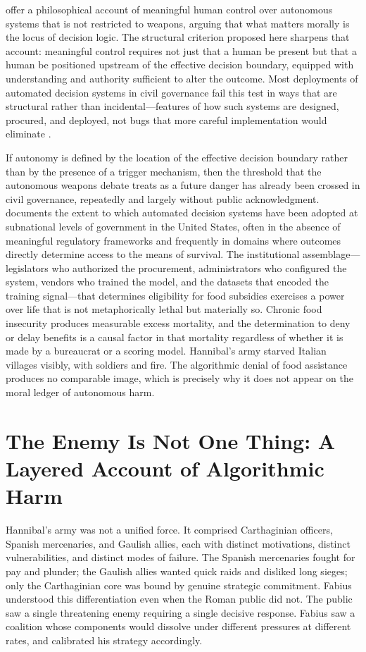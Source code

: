 \documentclass[12pt, a4paper]{article}
\begin{document}
\citet{santoni2018} offer a philosophical account of meaningful human control over autonomous systems that is not restricted to weapons, arguing that what matters morally is the locus of decision logic. The structural criterion proposed here sharpens that account: meaningful control requires not just that a human be present but that a human be positioned upstream of the effective decision boundary, equipped with understanding and authority sufficient to alter the outcome. Most deployments of automated decision systems in civil governance fail this test in ways that are structural rather than incidental---features of how such systems are designed, procured, and deployed, not bugs that more careful implementation would eliminate \citep{adalovace2021}.

If autonomy is defined by the location of the effective decision boundary rather than by the presence of a trigger mechanism, then the threshold that the autonomous weapons debate treats as a future danger has already been crossed in civil governance, repeatedly and largely without public acknowledgment. \citet{blochwehba2022} documents the extent to which automated decision systems have been adopted at subnational levels of government in the United States, often in the absence of meaningful regulatory frameworks and frequently in domains where outcomes directly determine access to the means of survival. The institutional assemblage---legislators who authorized the procurement, administrators who configured the system, vendors who trained the model, and the datasets that encoded the training signal---that determines eligibility for food subsidies exercises a power over life that is not metaphorically lethal but materially so. Chronic food insecurity produces measurable excess mortality, and the determination to deny or delay benefits is a causal factor in that mortality regardless of whether it is made by a bureaucrat or a scoring model. Hannibal's army starved Italian villages visibly, with soldiers and fire. The algorithmic denial of food assistance produces no comparable image, which is precisely why it does not appear on the moral ledger of autonomous harm.

\section{The Enemy Is Not One Thing: A Layered Account of Algorithmic Harm}

Hannibal's army was not a unified force. It comprised Carthaginian officers, Spanish mercenaries, and Gaulish allies, each with distinct motivations, distinct vulnerabilities, and distinct modes of failure. The Spanish mercenaries fought for pay and plunder; the Gaulish allies wanted quick raids and disliked long sieges; only the Carthaginian core was bound by genuine strategic commitment. Fabius understood this differentiation even when the Roman public did not. The public saw a single threatening enemy requiring a single decisive response. Fabius saw a coalition whose components would dissolve under different pressures at different rates, and calibrated his strategy accordingly.
\end{document}
